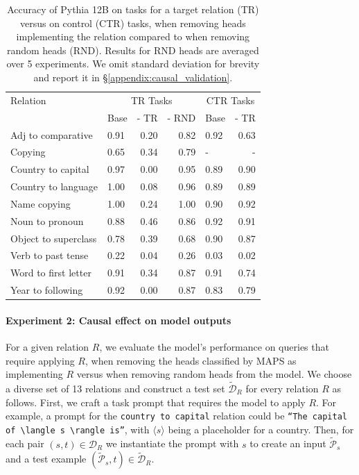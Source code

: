 \documentclass[11pt]{article}
\newcommand{\PythiaTwelveB}{Pythia 12B}
\newcommand{\framework}{\textsc{MAPS}}
\begin{document}
\begin{table}[t]
\setlength{\tabcolsep}{4pt}
\centering
\footnotesize
\begin{tabular}{llrrlr}
\toprule
Relation & \multicolumn{3}{c}{TR Tasks} & \multicolumn{2}{c}{CTR Tasks} \\
& Base &  - TR & - RND & Base &  - TR \\
\midrule
Adj to comparative & 0.91 & 0.20 & 0.82 & 0.92  & 0.63 \\
Copying & 0.65 & 0.34 & 0.79 & - & - \\
Country to capital & 0.97 & 0.00 & 0.95 & 0.89  & 0.90  \\
Country to language & 1.00 & 0.08 & 0.96  & 0.89  & 0.89  \\
Name copying & 1.00 & 0.24 & 1.00 & 0.90  & 0.92  \\
Noun to pronoun & 0.88 & 0.46 & 0.86 & 0.92  & 0.91 \\
Object to superclass & 0.78 & 0.39 & 0.68  & 0.90  & 0.87  \\
Verb to past tense & 0.22 & 0.04 & 0.26 & 0.03  & 0.02 \\
Word to first letter & 0.91 & 0.34 & 0.87  & 0.91  & 0.74  \\
Year to following & 0.92 & 0.00 & 0.87  & 0.83  & 0.79 \\
\bottomrule
\end{tabular}
\caption{Accuracy of \PythiaTwelveB{} on tasks for a target relation (TR) versus on control (CTR) tasks, when removing heads implementing the relation compared to when removing random heads (RND). Results for RND heads are averaged over 5 experiments. We omit standard deviation for brevity and report it in \S\ref{appendix:causal_validation}. 
} 
\label{tab:causal_results_pythia_12b_main}
\end{table}



\paragraph{Experiment 2: Causal effect on model outputs}
For a given relation $R$, we evaluate the model's performance on queries that require applying $R$, when removing the heads classified by \framework{} as implementing $R$ versus when removing random heads from the model.
We choose a diverse set of 13 relations and construct a test set $\tilde{\mathcal{D}}_R$ for every relation $R$ as follows. First, we craft a task prompt that requires the model to apply $R$. For example, a prompt for the \texttt{country to capital} relation could be \texttt{``The capital of $\langle s \rangle$ is''}, with $\langle s \rangle$ being a placeholder for a country. Then, for each pair $(s,t) \in \mathcal{D}_R$ we instantiate the prompt with $s$ to create an input $\tilde{\mathcal{P}}_s$ and a test example $(\tilde{\mathcal{P}}_s, t) \in \tilde{\mathcal{D}}_R$.
\end{document}
